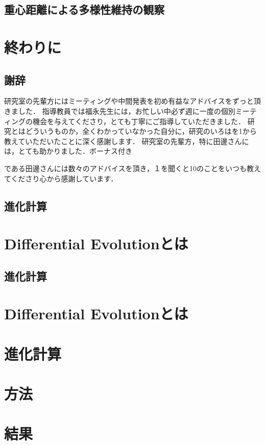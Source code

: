 \documentclass[a4paper,11pt,oneside,openany]{jsbook}
\begin{document}
\section{重心距離による多様性維持の観察}
\section{}

\chapter{終わりに}
\section{謝辞}
研究室の先輩方にはミーティングや中間発表を初め有益なアドバイスをずっと頂きました．
指導教員では福永先生には，お忙しい中必ず週に一度の個別ミーティングの機会を与えてくださり，とても丁寧にご指導していただきました．
研究とはどういうものか，全くわかっていなかった自分に，研究のいろはを1から教えていただいたことに深く感謝します．
研究室の先輩方，特に田邊さんには，とても助かりました．ボーナス付き

である田邊さんには数々のアドバイスを頂き，１を聞くと10のことをいつも教えてくださり心から感謝しています．

\section{進化計算}



\chapter{Differential Evolutionとは}
\section{進化計算}
\chapter{Differential Evolutionとは}
\chapter{進化計算}
\chapter{方法}

\chapter{結果}
\end{document}
